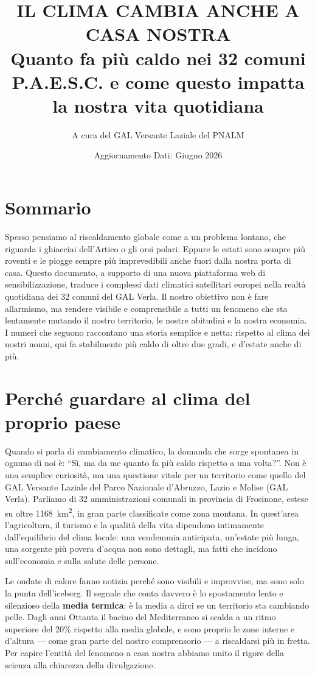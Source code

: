 \documentclass[11pt,a4paper]{article}
\title{\vspace{-1.4cm}\textbf{IL CLIMA CAMBIA ANCHE A CASA NOSTRA}\\[4pt]
\large Quanto fa più caldo nei 32 comuni P.A.E.S.C. e come questo impatta la nostra vita quotidiana}
\author{A cura del GAL Versante Laziale del PNALM}
\date{Aggiornamento Dati: Giugno 2026}
\begin{document}
\maketitle

\section*{Sommario}
Spesso pensiamo al riscaldamento globale come a un problema lontano, che riguarda i ghiacciai dell'Artico o gli orsi polari. Eppure le estati sono sempre più roventi e le piogge sempre più imprevedibili anche fuori dalla nostra porta di casa. Questo documento, a supporto di una nuova piattaforma web di sensibilizzazione, traduce i complessi dati climatici satellitari europei nella realtà quotidiana dei 32 comuni del GAL Verla. Il nostro obiettivo non è fare allarmismo, ma rendere visibile e comprensibile a tutti un fenomeno che sta lentamente mutando il nostro territorio, le nostre abitudini e la nostra economia. I numeri che seguono raccontano una storia semplice e netta: rispetto al clima dei nostri nonni, qui fa stabilmente più caldo di oltre due gradi, e d'estate anche di più.

\section{Perché guardare al clima del proprio paese}
Quando si parla di cambiamento climatico, la domanda che sorge spontanea in ognuno di noi è: ``Sì, ma da me quanto fa più caldo rispetto a una volta?''. Non è una semplice curiosità, ma una questione vitale per un territorio come quello del GAL Versante Laziale del Parco Nazionale d'Abruzzo, Lazio e Molise (GAL Verla). Parliamo di 32 amministrazioni comunali in provincia di Frosinone, estese su oltre \SI{1168}{\kilo\meter\squared}, in gran parte classificate come zona montana. In quest'area l'agricoltura, il turismo e la qualità della vita dipendono intimamente dall'equilibrio del clima locale: una vendemmia anticipata, un'estate più lunga, una sorgente più povera d'acqua non sono dettagli, ma fatti che incidono sull'economia e sulla salute delle persone.

Le ondate di calore fanno notizia perché sono visibili e improvvise, ma sono solo la punta dell'iceberg. Il segnale che conta davvero è lo spostamento lento e silenzioso della \textbf{media termica}: è la media a dirci se un territorio sta cambiando pelle. Dagli anni Ottanta il bacino del Mediterraneo si scalda a un ritmo superiore del 20\% rispetto alla media globale, e sono proprio le zone interne e d'altura --- come gran parte del nostro comprensorio --- a riscaldarsi più in fretta. Per capire l'entità del fenomeno a casa nostra abbiamo unito il rigore della scienza alla chiarezza della divulgazione.
\end{document}
